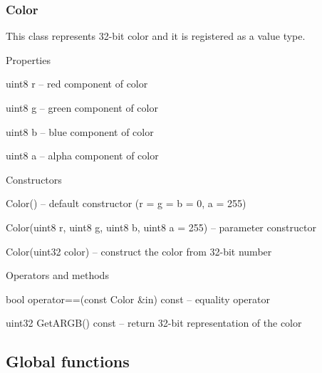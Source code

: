 \subsubsection{Color}

This class represents 32-bit color and it is registered as a value type.

\begin{titled-itemize}{Properties}
  \item uint8 r -- red component of color
  \item uint8 g -- green component of color
  \item uint8 b -- blue component of color
  \item uint8 a -- alpha component of color
\end{titled-itemize}

\begin{titled-itemize}{Constructors}
  \item Color() -- default constructor (r = g = b = 0, a = 255)
  \item Color(uint8 r, uint8 g, uint8 b, uint8 a = 255) -- parameter constructor
  \item Color(uint32 color) -- construct the color from 32-bit number
\end{titled-itemize}

\begin{titled-itemize}{Operators and methods}
  \item bool operator==(const Color \&in) const -- equality operator
  \item uint32 GetARGB() const -- return 32-bit representation of the color
\end{titled-itemize}

\subsection{Global functions}


